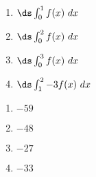 {\noindent
\begin{minipage}{\linewidth}
\end{minipage}
\begin{enumerate}
\item		$\ds \int_0^1 f(x)\ dx$
\item		$\ds \int_0^2 f(x)\ dx$
\item		$\ds \int_0^3 f(x)\ dx$
\item		$\ds \int_1^2 -3f(x)\ dx$
\end{enumerate}

}
{\begin{enumerate}
\item		$-59$
\item		$-48$
\item		$-27$
\item		$-33$
\end{enumerate}
}

